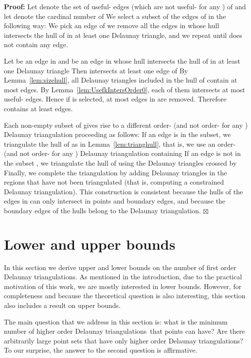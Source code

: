 \documentclass {journal}
\newenvironment {proof}{\textbf {Proof:}}{\hfill \ensuremath {\boxtimes}}
\newcommand {\hodts}{higher order Delaunay triangulations}
\newcommand {\fodts}{first order Delaunay triangulations}
\begin{document}
\begin{proof}
Let  denote the set of useful- edges (which are not
useful- for any ) of  and let  denote the
cardinal number of  We select a subset  of the edges
of  in the following way: We pick an edge  of  we
remove all the edges in  whose hull intersects the hull of
 in at least one Delaunay triangle, and we repeat until 
does not contain any edge.

Let  be an edge in  and  be an edge in  whose
hull intersects the hull of  in at least one Delaunay triangle
 Then  intersects at least one edge of  By
Lemma~\ref{lem:sizehull}, all Delaunay triangles included in the
hull of  contain at most  edges. By
Lemma~\ref{lem:UsefkIntersOrder0}, each of them intersects at most
 useful- edges. Hence if  is selected, at most
 edges in  are removed. Therefore 
contains at least  edges.

Each non-empty subset of  gives rise to a different
order- (and not order- for any ) Delaunay
triangulation proceeding as follows: If an edge  is in the
subset, we triangulate the hull of  as in
Lemma~\ref{lem:trianghull}, that is, we use an order- (and not
order- for any ) Delaunay triangulation containing 
If an edge  is not in the subset , we triangulate the hull of
 using the Delaunay triangles crossed by 
Finally, we complete the
triangulation by adding Delaunay triangles in the regions that
have not been triangulated (that is, computing a constrained Delaunay
triangulation). This construction is consistent because the hulls
of the edges in  can only intersect in points and boundary
edges, and because the boundary edges of the hulls belong to the
Delaunay triangulation.
\end{proof}




\section{Lower and upper bounds}
\label{sec:bounds}

In this section we derive upper and lower bounds on the number of \fodts.
As mentioned in the introduction, due to the practical motivation of this work, we are mostly interested in lower bounds.
However, for completeness and because the theoretical question is also interesting, this section also includes a result on upper bounds.

The main question that we address in this section is: what is the minimum number of \hodts\ that  points can have?
Are there arbitrarily large point sets that have only  \hodts?
To our surprise, the answer to the second question is affirmative.
\end{document}
